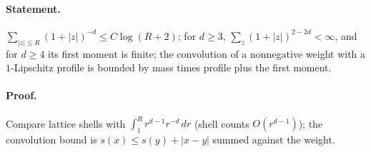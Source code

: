 \paragraph{Statement.} $\sum_{|z|\leq R}(1+|z|)^{-d}\leq C\log(R+2)$; for $d\geq3$, $\sum_z(1+|z|)^{2-2d}<\infty$, and for $d\geq4$ its first moment is finite; the convolution of a nonnegative weight with a $1$-Lipschitz profile is bounded by mass times profile plus the first moment.
\paragraph{Proof.} Compare lattice shells with $\int_1^R r^{d-1}r^{-d}\,dr$ (shell counts $O(r^{d-1})$); the convolution bound is $s(x)\leq s(y)+|x-y|$ summed against the weight.
